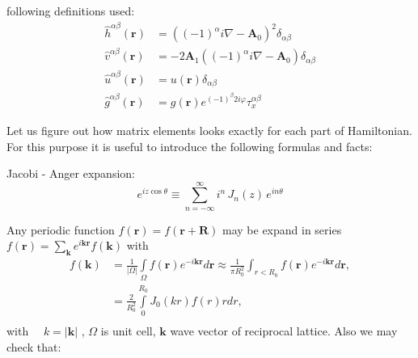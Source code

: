 \documentclass[a4paper,article,14pt]{extarticle}
\begin{document}
\noindent following definitions used:
\begin{equation}
\begin{aligned}
\hat h^{\alpha \beta}(\mathbf{r})   &= \left( (-1)^\alpha i \nabla - \mathbf{A}_0 \right) ^ 2 \delta_{\alpha \beta} \\
\hat v^{\alpha \beta}(\mathbf{r})   &= - 2 \mathbf{A}_1 \left( (-1)^{\alpha} i \nabla - \mathbf{A}_0 \right) \delta_{\alpha \beta} \\
\hat u^{\alpha \beta}(\mathbf{r})   &= u(\mathbf{r})  \delta_{\alpha \beta}\\
\hat g^{\alpha \beta} (\mathbf{r}) &=   g(\mathbf{r})  e^{ (-1)^{\beta} 2  i   \varphi} \tau^{\alpha \beta}_x 
\end{aligned}
\end{equation}

\noindent Let us figure out how matrix elements looks  exactly for each part of Hamiltonian. For this purpose it is useful to introduce the following formulas and facts:

\noindent Jacobi - Anger expansion:
$$
e^{i z \cos \theta} \equiv \sum_{n=-\infty}^{\infty} i^n\, J_n(z)\, e^{i n \theta}
$$

\noindent Any periodic function $f(\mathbf{r}) = f (\mathbf{r} + \mathbf{R})$ %
may be expand in series $f (\mathbf{r}) = \sum\limits_{\mathbf{k} } e^{i \mathbf{k}  \mathbf{r}} f(\mathbf{k}) $ with
\begin{equation}
\begin{aligned}
f (\mathbf{k}) &= \frac{1} {|\Omega|} \int\limits_\Omega f (  \mathbf{r} ) e^{- i \mathbf{k} \mathbf{r}} d \mathbf{r} \approx \frac{1}{\pi R_0^2}  \int_{r<R_{0}}  f(\mathbf{r})   e^{-i\mathbf{k r}}  d \mathbf{r} , \\
&   = \frac{2}{R_0^2}  \int\limits_{0}^{R_0}  J_0 (k r ) f(r) r dr ,    \\
\end{aligned}
\end{equation} 
with $\quad k = \left|\mathbf{k}\right| $ ,
$\Omega$ is unit cell, $\mathbf{k}$ wave vector of reciprocal lattice. Also we may check that:
\end{document}
